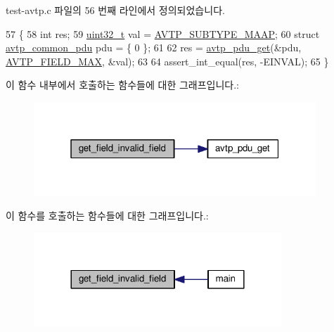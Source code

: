 test-\/avtp.\+c 파일의 56 번째 라인에서 정의되었습니다.


\begin{DoxyCode}
57 \{
58     \textcolor{keywordtype}{int} res;
59     \hyperlink{parse_8c_a6eb1e68cc391dd753bc8ce896dbb8315}{uint32\_t} val = \hyperlink{avtp_8h_a928c9428ff3598096d6794424f66e23e}{AVTP\_SUBTYPE\_MAAP};
60     \textcolor{keyword}{struct }\hyperlink{structavtp__common__pdu}{avtp\_common\_pdu} pdu = \{ 0 \};
61 
62     res = \hyperlink{avtp_8h_a5834d6469319080f4b98b71db402a672}{avtp\_pdu\_get}(&pdu, \hyperlink{avtp_8h_ae8ac82f40d36ba8c7a71a451a1d7ddf0aa105870d48a5be0ad4bc9230a41f18e9}{AVTP\_FIELD\_MAX}, &val);
63 
64     assert\_int\_equal(res, -EINVAL);
65 \}
\end{DoxyCode}


이 함수 내부에서 호출하는 함수들에 대한 그래프입니다.\+:
\nopagebreak
\begin{figure}[H]
\begin{center}
\leavevmode
\includegraphics[width=301pt]{test-avtp_8c_a5a724ecbb2e0c13d66eb791920aa656c_cgraph}
\end{center}
\end{figure}




이 함수를 호출하는 함수들에 대한 그래프입니다.\+:
\nopagebreak
\begin{figure}[H]
\begin{center}
\leavevmode
\includegraphics[width=264pt]{test-avtp_8c_a5a724ecbb2e0c13d66eb791920aa656c_icgraph}
\end{center}
\end{figure}



